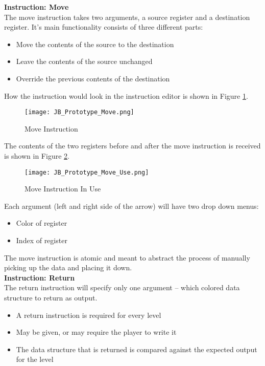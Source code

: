 \textbf{Instruction: Move}\\

The move instruction takes two arguments, a source register and a destination register.
It's main functionality consists of three different parts:

\begin{itemize}
  \item Move the contents of the source to the destination
  \item Leave the contents of the source unchanged
  \item Override the previous contents of the destination
\end{itemize}

How the instruction would look in the instruction editor is shown in Figure
\ref{fig:Move_Instruction}.

\begin{figure}[!hb]
  \caption{Move Instruction}
  \label{fig:Move_Instruction}
  \centering
  \texttt{[image: JB\_Prototype\_Move.png]}
\end{figure}

The contents of the two registers before and after the move instruction is
received is shown in Figure \ref{fig:Move_Instruction_Use}.

\begin{figure}[!hb]
  \caption{Move Instruction In Use}
  \label{fig:Move_Instruction_Use}
  \centering
  \texttt{[image: JB\_Prototype\_Move\_Use.png]}
\end{figure}

Each argument (left and right side of the arrow) will have two drop down menus:
\begin{itemize}
  \item Color of register
  \item Index of register
\end{itemize}

The move instruction is atomic and meant to abstract the process of manually
picking up the data and placing it down.\\

\textbf{Instruction: Return}\\

The return instruction will specify only one argument -- which colored data structure
to return as output.
\begin{itemize}
  \item A return instruction is required for every level
  \item May be given, or may require the player to write it
  \item The data structure that is returned is compared against the expected
  output for the level
\end{itemize}

